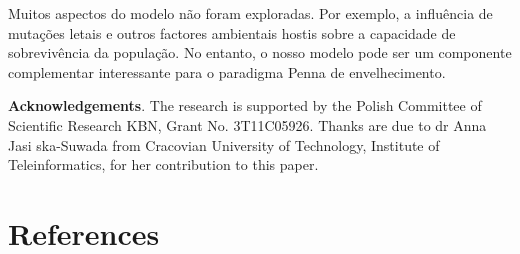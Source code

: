 \documentclass{article}
\begin{document}
Muitos aspectos do modelo não foram exploradas. Por exemplo, a influência de mutações letais e outros factores ambientais hostis sobre a capacidade de sobrevivência da população. No entanto, o nosso modelo pode ser um componente complementar interessante para o paradigma Penna de envelhecimento.


\textbf{Acknowledgements}. The research is supported by the Polish Committee of Scientific Research KBN, Grant No. 3T11C05926. Thanks are due to dr Anna Jasi ska-Suwada from Cracovian University of Technology, Institute of Teleinformatics, for her contribution to this paper.

\newpage


\section{References}
\end{document}

